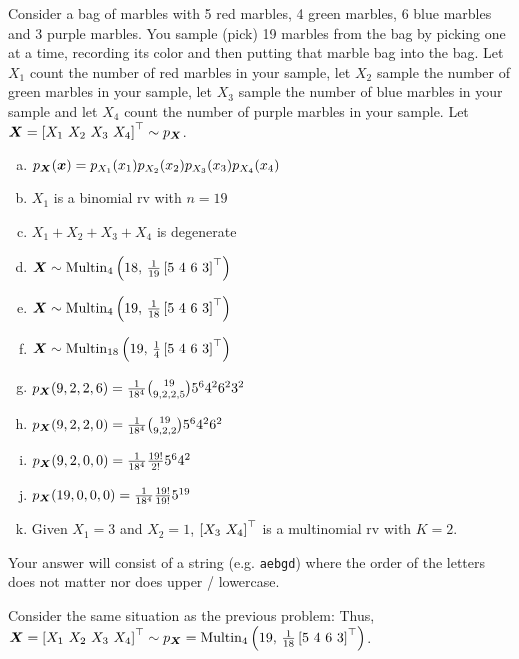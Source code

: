 \documentclass[12pt,landscape]{article}
\newcommand{\instr}{\small Your answer will consist of a string (e.g. \texttt{aebgd}) where the order of the letters does not matter nor does upper / lowercase. \normalsize}
\begin{document}


\problem{} Consider a bag of marbles with 5 red marbles, 4 green marbles, 6 blue marbles and 3 purple marbles. You sample (pick) 19 marbles from the bag by picking one at a time, recording its color and then putting that marble bag into the bag. Let $X_1$ count the number of red marbles in your sample, let $X_2$ sample the number of green marbles in your sample, let $X_3$ sample the number of blue marbles in your sample and let $X_4$ count the number of purple marbles in your sample. Let $\boldsymbol{X} = \left[X_1 ~ X_2 ~ X_3~ X_4\right]^\top \sim p_{\boldsymbol{X}}$.
\vspace{-0.2cm}\benum{} 

\begin{enumerate}[(a)]
\item $p_{\boldsymbol{X}}(\boldsymbol{x}) = p_{X_1}(x_1) p_{X_2}(x_2) p_{X_3}(x_3) p_{X_4}(x_4)$
\item $X_1$ is a binomial rv with $n = 19$
\item $X_1 + X_2 + X_3 + X_4$ is degenerate
\item $\boldsymbol{X} \sim \mathrm{Multin}_{4}\left(18,\,\frac{1}{19}\left[5 ~4 ~6 ~3\right]^\top \right)$
\item $\boldsymbol{X} \sim \mathrm{Multin}_{4}\left(19,\,\frac{1}{18}\left[5 ~4 ~6 ~3\right]^\top \right)$
\item $\boldsymbol{X} \sim \mathrm{Multin}_{18}\left(19,\,\frac{1}{4}\left[5 ~4 ~6 ~3\right]^\top \right)$
\item $p_{\boldsymbol{X}}(9,2,2,6) = \frac{1}{18^4}\binom{19}{9,2,2,5} 5^6 4^2 6^2 3^2$
\item $p_{\boldsymbol{X}}(9,2,2,0) = \frac{1}{18^4}\binom{19}{9,2,2} 5^6 4^2 6^2$
\item $p_{\boldsymbol{X}}(9,2,0,0) = \frac{1}{18^4} \frac{19!}{2!} 5^6 4^2 $
\item $p_{\boldsymbol{X}}(19,0,0,0) = \frac{1}{18^4} \frac{19!}{19!} 5^{19}$
\item Given $X_1 = 3$ and $X_2 = 1$, $\left[X_3~X_4\right]^\top$ is a multinomial rv with $K=2$.
\end{enumerate}
\eenum\instr\pagebreak



\problem{} Consider the same situation as the previous problem:  Thus, $\boldsymbol{X} = \left[X_1 ~ X_2 ~ X_3~ X_4\right]^\top \sim p_{\boldsymbol{X}} = \mathrm{Multin}_{4}\left(19,\,\frac{1}{18}\left[5 ~4 ~6 ~3\right]^\top\right)$.
\vspace{-0.2cm}\benum{} 
\end{document}
